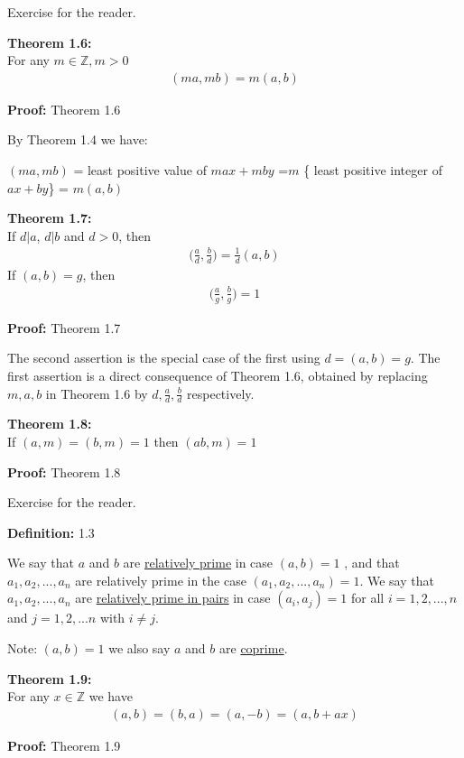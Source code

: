 \documentclass[a4paper]{article}
\begin{document}
Exercise for the reader.



\textbf{Theorem 1.6:}\\
For any $m\in\mathbb{Z}, m>0$
\begin{align*}
    (ma,mb)=m(a,b)
\end{align*}

\textbf{Proof:} Theorem 1.6

By Theorem 1.4 we have:

$(ma,mb)$ = least positive value of $max+mby$
=$m$ \{ least positive integer of $ax+by$\}
= $m(a,b)$


\textbf{Theorem 1.7:}\\
If $d|a$, $d|b$ and $d>0$, then
\begin{align*}
    \bigg(\frac{a}{d},\frac{b}{d}\bigg)=\frac{1}{d}(a,b)
\end{align*}
If $(a,b)=g$, then
\begin{align*}
    \bigg(\frac{a}{g},\frac{b}{g}\bigg)=1
\end{align*}



\textbf{Proof:} Theorem 1.7

The second assertion is the special case of the first using $d=(a,b)=g$.
The first assertion is a direct consequence of Theorem 1.6, obtained by replacing
$m,a,b$ in Theorem 1.6 by $d,\frac{a}{d},\frac{b}{d}$ respectively.

\textbf{Theorem 1.8:}\\
If $(a,m)=(b,m)=1$ then $(ab,m)=1$

\textbf{Proof:} Theorem 1.8

Exercise for the reader.

\textbf{Definition:} 1.3

We say that $a$ and $b$ are \underline{relatively prime} in case $(a,b)=1$
, and that $a_1,a_2,...,a_n$ are relatively prime in the case $(a_1,a_2,...,a_n)=1$.
We say that $a_1,a_2,...,a_n$ are \underline{relatively prime in pairs} in
case $(a_i,a_j)=1$ for all $i=1,2,...,n$ and $j=1,2,...n$ with $i \neq j$.

Note: $(a,b)=1$ we also say $a$ and $b$ are \underline{coprime}.

\textbf{Theorem 1.9:}\\
For any $x\in\mathbb{Z}$ we have
\begin{align*}
(a,b)=(b,a)=(a,-b)=(a,b+ax)
\end{align*}

\textbf{Proof:} Theorem 1.9
\end{document}
